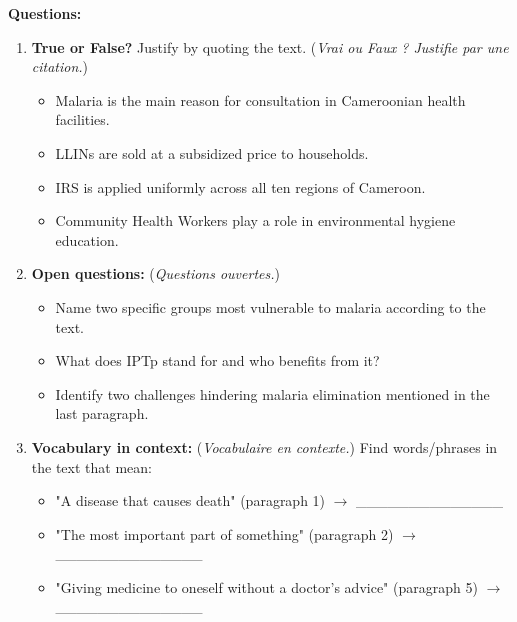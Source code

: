 \documentclass[11pt]{article}
\begin{document}
\begin{exercice}
\vspace{0.5em}
\textbf{Questions:}
\begin{enumerate}
    \item \textbf{True or False?} Justify by quoting the text. (\emph{Vrai ou Faux ? Justifie par une citation.})
    \begin{itemize}
        \item[a)] Malaria is the main reason for consultation in Cameroonian health facilities.
        \item[b)] LLINs are sold at a subsidized price to households.
        \item[c)] IRS is applied uniformly across all ten regions of Cameroon.
        \item[d)] Community Health Workers play a role in environmental hygiene education.
    \end{itemize}
    \item \textbf{Open questions:} (\emph{Questions ouvertes.})
    \begin{itemize}
        \item[e)] Name two specific groups most vulnerable to malaria according to the text.
        \item[f)] What does IPTp stand for and who benefits from it?
        \item[g)] Identify two challenges hindering malaria elimination mentioned in the last paragraph.
    \end{itemize}
    \item \textbf{Vocabulary in context:} (\emph{Vocabulaire en contexte.}) Find words/phrases in the text that mean:
    \begin{itemize}
        \item[h)] "A disease that causes death" (paragraph 1) $\rightarrow$ \_\_\_\_\_\_\_\_\_\_\_\_\_\_
        \item[i)] "The most important part of something" (paragraph 2) $\rightarrow$ \_\_\_\_\_\_\_\_\_\_\_\_\_\_
        \item[j)] "Giving medicine to oneself without a doctor's advice" (paragraph 5) $\rightarrow$ \_\_\_\_\_\_\_\_\_\_\_\_\_\_
    \end{itemize}
\end{enumerate}
\end{exercice}
\end{document}
